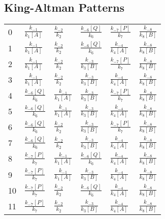 \documentclass{article}%
\begin{document}
\subsection{King{-}Altman Patterns}%
\label{subsec:King{-}Altman Patterns}%
\begin{tabular}{llllll}
\toprule
0  &  $\frac{k_{-1}}{k_{1}[A]}$ &     $\frac{k_{-2}}{k_{2}}$ &  $\frac{k_{-6}[Q]}{k_{6}}$ &  $\frac{k_{-7}[P]}{k_{7}}$ &  $\frac{k_{-8}}{k_{8}[B]}$ \\
1  &  $\frac{k_{-1}}{k_{1}[A]}$ &     $\frac{k_{-2}}{k_{2}}$ &  $\frac{k_{-6}[Q]}{k_{6}}$ &  $\frac{k_{-4}}{k_{4}[A]}$ &  $\frac{k_{-8}}{k_{8}[B]}$ \\
2  &  $\frac{k_{-1}}{k_{1}[A]}$ &     $\frac{k_{-2}}{k_{2}}$ &  $\frac{k_{-3}}{k_{3}[B]}$ &  $\frac{k_{-7}[P]}{k_{7}}$ &  $\frac{k_{-8}}{k_{8}[B]}$ \\
3  &  $\frac{k_{-1}}{k_{1}[A]}$ &     $\frac{k_{-2}}{k_{2}}$ &  $\frac{k_{-3}}{k_{3}[B]}$ &  $\frac{k_{-4}}{k_{4}[A]}$ &  $\frac{k_{-8}}{k_{8}[B]}$ \\
4  &  $\frac{k_{-6}[Q]}{k_{6}}$ &  $\frac{k_{-1}}{k_{1}[A]}$ &  $\frac{k_{-3}}{k_{3}[B]}$ &  $\frac{k_{-7}[P]}{k_{7}}$ &  $\frac{k_{-8}}{k_{8}[B]}$ \\
5  &  $\frac{k_{-6}[Q]}{k_{6}}$ &  $\frac{k_{-1}}{k_{1}[A]}$ &  $\frac{k_{-3}}{k_{3}[B]}$ &  $\frac{k_{-4}}{k_{4}[A]}$ &  $\frac{k_{-8}}{k_{8}[B]}$ \\
6  &  $\frac{k_{-6}[Q]}{k_{6}}$ &     $\frac{k_{-2}}{k_{2}}$ &  $\frac{k_{-3}}{k_{3}[B]}$ &  $\frac{k_{-7}[P]}{k_{7}}$ &  $\frac{k_{-8}}{k_{8}[B]}$ \\
7  &  $\frac{k_{-6}[Q]}{k_{6}}$ &     $\frac{k_{-2}}{k_{2}}$ &  $\frac{k_{-3}}{k_{3}[B]}$ &  $\frac{k_{-4}}{k_{4}[A]}$ &  $\frac{k_{-8}}{k_{8}[B]}$ \\
8  &  $\frac{k_{-7}[P]}{k_{7}}$ &  $\frac{k_{-1}}{k_{1}[A]}$ &  $\frac{k_{-6}[Q]}{k_{6}}$ &  $\frac{k_{-4}}{k_{4}[A]}$ &  $\frac{k_{-8}}{k_{8}[B]}$ \\
9  &  $\frac{k_{-7}[P]}{k_{7}}$ &  $\frac{k_{-1}}{k_{1}[A]}$ &  $\frac{k_{-3}}{k_{3}[B]}$ &  $\frac{k_{-4}}{k_{4}[A]}$ &  $\frac{k_{-8}}{k_{8}[B]}$ \\
10 &  $\frac{k_{-7}[P]}{k_{7}}$ &     $\frac{k_{-2}}{k_{2}}$ &  $\frac{k_{-6}[Q]}{k_{6}}$ &  $\frac{k_{-4}}{k_{4}[A]}$ &  $\frac{k_{-8}}{k_{8}[B]}$ \\
11 &  $\frac{k_{-7}[P]}{k_{7}}$ &     $\frac{k_{-2}}{k_{2}}$ &  $\frac{k_{-3}}{k_{3}[B]}$ &  $\frac{k_{-4}}{k_{4}[A]}$ &  $\frac{k_{-8}}{k_{8}[B]}$ \\
\bottomrule
\end{tabular}
\end{document}
